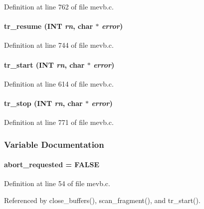 Definition at line 762 of file mevb.c.
\paragraph[{tr\_\-resume}]{ tr\_\-resume ({\bf INT} {\em rn}, \/  char $\ast$ {\em error})}\hfill\label{mevb_8c_ac69f1c3106f3389ed0dde43e7b86e54d}


Definition at line 744 of file mevb.c.
\paragraph[{tr\_\-start}]{ tr\_\-start ({\bf INT} {\em rn}, \/  char $\ast$ {\em error})}\hfill\label{mevb_8c_a5ed14877e514f13eeb65a16898b2ba32}


Definition at line 614 of file mevb.c.
\paragraph[{tr\_\-stop}]{ tr\_\-stop ({\bf INT} {\em rn}, \/  char $\ast$ {\em error})}\hfill\label{mevb_8c_a5c030a1926f2439e78b7bd0d00221937}


Definition at line 771 of file mevb.c.

\subsubsection{Variable Documentation}
\paragraph[{abort\_\-requested}]{ {\bf abort\_\-requested} = FALSE}\hfill\label{mevb_8c_a54839dc95559831239bc7ca9cc118392}


Definition at line 54 of file mevb.c.

Referenced by close\_\-buffers(), scan\_\-fragment(), and tr\_\-start().
